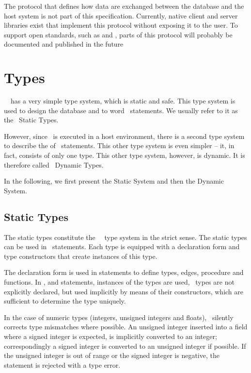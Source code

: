 The protocol that defines how data are exchanged
between the database and the host system
is not part of this specification.
Currently, native client and server libraries
exist that implement this protocol
without exposing it to the user.
To support open standards, such as
 and ,
parts of this protocol
will probably be documented
and published in the future

\section{Types}
\nowdb\ \sql\
has a very simple type system,
which is static and safe.
This type system is used to design
the database and to word
\sql\ statements.
We usually refer to it as the \sql\ Static Types.

However, since \sql\ is executed
in a host environment, there is a second
type system to describe the 
of \sql\ statements.
This other type system is even simpler --
it, in fact, consists of only one type.
This other type system, however, is dynamic.
It is therefore called \sql\ Dynamic Types.

In the following, we first present
the Static System and then the Dynamic System.

\subsection{Static Types}
The static types constitute
the \nowdb\ \sql\ type system in the strict sense.
The static types can be used in \sql\ statements.
Each type is equipped with a declaration form and
type constructors that create instances of this type.

The declaration form is used in  statements
to define types, edges, procedure and functions.
In ,  and  statements,
instances of the types are used, \ie\
types are not explicitly declared, but used implicitly
by means of their constructors, which are sufficient
to determine the type uniquely.

In the case of numeric types
(integers, unsigned integers and floats),
\nowdb\ silently corrects type mismatches where possible.
An unsigned integer inserted into a field where
a signed integer is expected, is implicitly converted
to an integer; correspondingly a signed integer
is converted to an unsigned integer if possible.
If the unsigned integer is out of range or
the signed integer is negative, the statement
is rejected with a type error.

